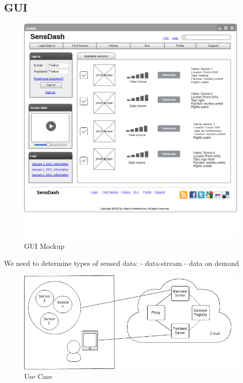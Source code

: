 \subsection{GUI}
\begin{figure}[!ht]
\centering
\includegraphics[scale=0.5]{images/Mockup.png}   
\caption[GUI Mocku]{GUI Mockup}
\label{img:GUI Mockup}                           
\end{figure}
 We need to determine types of sensed data:
 \newline
  - data-stream
  \newline
  - data on demand
\begin{figure}[!ht]
\centering
\includegraphics[scale=0.5]{images/User_Case.png}   
\caption[Use Case]{Use Case}
\label{img:structure}                           
\end{figure}

